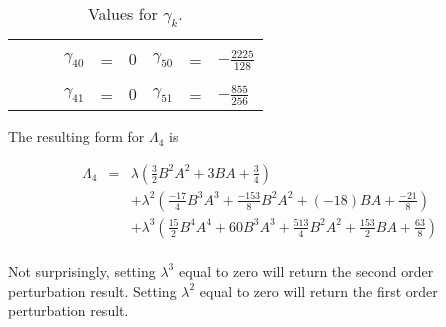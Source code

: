 \documentclass{article}
\begin{document}
\begin{table}[!hp]
\begin{center}
\begin{tabular}{rclrclrcl}
               &   &                           &               &   &          &               &   &                        \\
               &   &                           & $\gamma_{40}$ & = & $ 0 $    & $\gamma_{50}$ & = & $ -\frac{2225}{128}  $ \\
               &   &                           &               &   &          &               &   &                        \\
               &   &                           & $\gamma_{41}$ & = & $ 0 $    & $\gamma_{51}$ & = & $ -\frac{855}{256}   $
\end{tabular}
\caption{Values for $\gamma_{k}$. \label{tabSolvedGammaValues}}
\end{center}
\end{table}

\clearpage
\newpage

The resulting form for $\Lambda_{4}$ is

\begin{eqnarray}
\Lambda_{4} & = & \lambda(\frac{3}{2}B^{2}A^{2}+3BA+\frac{3}{4}) \nonumber \\
            &   & + \lambda^{2}(\frac{-17}{4}B^{3}A^{3}+\frac{-153}{8}B^{2}A^{2}+(-18)BA+\frac{-21}{8}) \nonumber \\
            &   & + \lambda^{3}(\frac{15}{2}B^{4}A^{4}+60B^{3}A^{3}+\frac{513}{4}B^{2}A^{2}+\frac{153}{2}BA+\frac{63}{8}) \nonumber \\
\end{eqnarray}

Not surprisingly, setting $\lambda^{3}$ equal to zero will return the second order perturbation result.  Setting $\lambda^{2}$ equal to zero will return the first order perturbation result.
\end{document}
